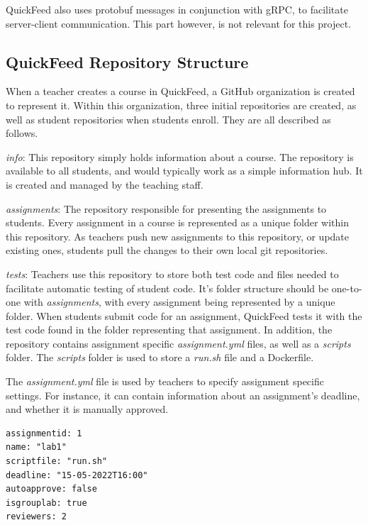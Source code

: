 QuickFeed also uses protobuf messages in conjunction with gRPC, to facilitate server-client communication.
This part however, is not relevant for this project.

\subsection{QuickFeed Repository Structure}
\label{sec:quickfeed-repository-structure}

When a teacher creates a course in QuickFeed, a GitHub organization is created to represent it.
Within this organization, three initial repositories are created, as well as student repositories when students enroll.
They are all described as follows.

\textit{info}: This repository simply holds information about a course.
The repository is available to all students, and would typically work as a simple information hub.
It is created and managed by the teaching staff.

\textit{assignments}: The repository responsible for presenting the assignments to students.
Every assignment in a course is represented as a unique folder within this repository.
As teachers push new assignments to this repository, or update existing ones, students pull the changes to their own local git repositories.

\textit{tests}: Teachers use this repository to store both test code and files needed to facilitate automatic testing of student code.
It's folder structure should be one-to-one with \textit{assignments}, with every assignment being represented by a unique folder.
When students submit code for an assignment, QuickFeed tests it with the test code found in the folder representing that assignment.
In addition, the repository contains assignment specific \textit{assignment.yml} files, as well as a \textit{scripts} folder.
The \textit{scripts} folder is used to store a \textit{run.sh} file and a Dockerfile.

The \textit{assignment.yml} file is used by teachers to specify assignment specific settings.
For instance, it can contain information about an assignment's deadline, and whether it is manually approved.

\begin{lstlisting}[caption={Example contents of an \textit{assignment.yml} file}, numbers=none]
assignmentid: 1
name: "lab1"
scriptfile: "run.sh"
deadline: "15-05-2022T16:00"
autoapprove: false
isgrouplab: true
reviewers: 2
\end{lstlisting}

